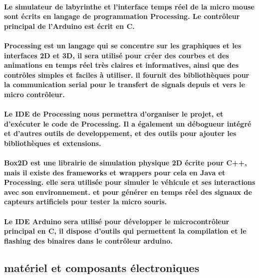 \paragraph{
   Le simulateur de labyrinthe et l'interface temps réel de la micro mouse sont écrits en
langage de programmation Processing. Le contrôleur principal de l'Arduino est écrit en C.
}

\paragraph{
   Processing est un langage qui se concentre sur les graphiques et les interfaces 2D et 3D,
il sera utilisé pour créer des courbes et des animations en temps réel très claires et 
informatives, ainsi que des contrôles simples et faciles à utiliser. il fournit des 
bibliothèques pour la communication serial pour le transfert de signals depuis et vers le
micro contrôleur.
}

\paragraph{
   Le IDE de Processing nous permettra d'organiser le projet, et d'exécuter le code de Processing.
Il a également un débogueur intégré et d'autres outils de developpement, et des outils pour
ajouter les bibliothèques et extensions.
}

\paragraph{
   Box2D est une librairie de simulation physique 2D écrite pour C++, mais il existe des frameworks
et wrappers pour cela en Java et Processing. elle sera utilisée pour simuler le véhicule et ses
interactions avec son environnement. et pour générer en temps réel des signaux de capteurs
artificiels pour tester la micro souris.
}

\paragraph{
   Le IDE Arduino sera utilisé pour développer le microcontrôleur principal en C, il dispose d'outils
qui permettent la compilation et le flashing des binaires dans le contrôleur arduino.
}

\subsection{matériel et composants électroniques} \label{subsec:hardDev}

